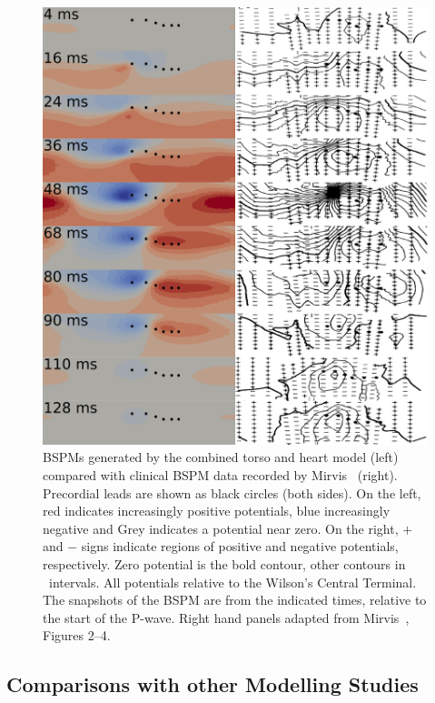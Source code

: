 \begin{figure}
\includegraphics{figures/bsp/mirvis_compare}
\caption[Comparative BSPM from the fully inhomogeneous model and Mirvis]{
\label{bsp:fig:mirvis_compare}
BSPMs generated by the combined torso and heart model (left) compared with
clinical BSPM data recorded by Mirvis~\cite{Mirvis1980} (right).
Precordial leads are shown as black circles (both sides).
On the left, red indicates increasingly positive potentials, blue increasingly
negative and Grey indicates a potential near zero.
On the right, $+$ and $-$ signs indicate regions of positive and negative
potentials, respectively.
Zero potential is the bold contour, other contours in \ intervals.
All potentials relative to the Wilson's Central Terminal.
The snapshots of the BSPM are from the indicated times, relative to the start of
the P-wave.
Right hand panels adapted from Mirvis~\cite{Mirvis1980}, Figures 2--4.
}
\end{figure}

\subsection{Comparisons with other Modelling Studies}

